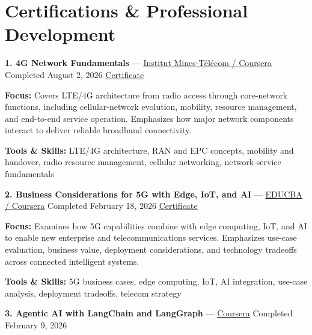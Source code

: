 \documentclass[9pt,letterpaper]{extarticle}
\begin{document}
\section{Certifications \& Professional Development}
\noindent\textbf{1. 4G Network Fundamentals} {\small --- \textcolor{blue}{\underline{\href{https://www.coursera.org/account/accomplishments/verify/DLW1YN474VZJ}{Institut Mines-Télécom / Coursera}}} \textbar{} Completed \textbar{} August 2, 2026 \textbar{} \textcolor{blue}{\underline{\href{https://waseemraza844.github.io/portfolio/certificates/wireless/4g-network-fundamentals.pdf}{Certificate}}}}\par
\textbf{Focus:} Covers LTE/4G architecture from radio access through core-network functions, including cellular-network evolution, mobility, resource management, and end-to-end service operation. Emphasizes how major network components interact to deliver reliable broadband connectivity.\par
{\small\textbf{Tools \& Skills:} LTE/4G architecture, RAN and EPC concepts, mobility and handover, radio resource management, cellular networking, network-service fundamentals\par}
\vspace{2pt}
\noindent\textbf{2. Business Considerations for 5G with Edge, IoT, and AI} {\small --- \textcolor{blue}{\underline{\href{https://www.coursera.org/account/accomplishments/verify/SAUEVQXV5W71}{EDUCBA / Coursera}}} \textbar{} Completed \textbar{} February 18, 2026 \textbar{} \textcolor{blue}{\underline{\href{https://waseemraza844.github.io/portfolio/certificates/wireless/bus-cons-5g.pdf}{Certificate}}}}\par
\textbf{Focus:} Examines how 5G capabilities combine with edge computing, IoT, and AI to enable new enterprise and telecommunications services. Emphasizes use-case evaluation, business value, deployment considerations, and technology tradeoffs across connected intelligent systems.\par
{\small\textbf{Tools \& Skills:} 5G business cases, edge computing, IoT, AI integration, use-case analysis, deployment tradeoffs, telecom strategy\par}
\vspace{2pt}
\noindent\textbf{3. Agentic AI with LangChain and LangGraph} {\small --- \textcolor{blue}{\underline{\href{https://www.coursera.org/account/accomplishments/verify/L4EY4SLGCPUE}{Coursera}}} \textbar{} Completed \textbar{} February 9, 2026}\par
\end{document}
